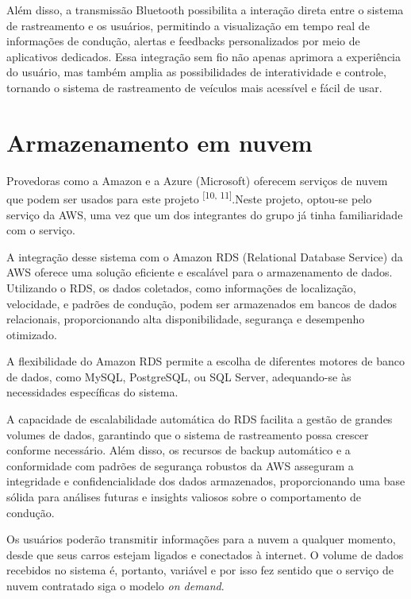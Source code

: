 Além disso, a transmissão Bluetooth possibilita a interação direta entre o sistema de rastreamento e os usuários, permitindo a visualização em tempo real de informações de condução, alertas e feedbacks personalizados por meio de aplicativos dedicados. Essa integração sem fio não apenas aprimora a experiência do usuário, mas também amplia as possibilidades de interatividade e controle, tornando o sistema de rastreamento de veículos mais acessível e fácil de usar.

\section{Armazenamento em nuvem}
Provedoras como a Amazon e a Azure (Microsoft) oferecem serviços de nuvem que podem ser usados para este projeto \textsuperscript{[10, 11]}.Neste projeto, optou-se pelo serviço da AWS, uma vez que um dos integrantes do grupo já tinha familiaridade com o serviço.

A integração desse sistema com o Amazon RDS (Relational Database Service) da AWS oferece uma solução eficiente e escalável para o armazenamento de dados. Utilizando o RDS, os dados coletados, como informações de localização, velocidade, e padrões de condução, podem ser armazenados em bancos de dados relacionais, proporcionando alta disponibilidade, segurança e desempenho otimizado. 

A flexibilidade do Amazon RDS permite a escolha de diferentes motores de banco de dados, como MySQL, PostgreSQL, ou SQL Server, adequando-se às necessidades específicas do sistema.

A capacidade de escalabilidade automática do RDS facilita a gestão de grandes volumes de dados, garantindo que o sistema de rastreamento possa crescer conforme necessário. Além disso, os recursos de backup automático e a conformidade com padrões de segurança robustos da AWS asseguram a integridade e confidencialidade dos dados armazenados, proporcionando uma base sólida para análises futuras e insights valiosos sobre o comportamento de condução.

Os usuários poderão transmitir informações para a nuvem a qualquer momento, desde que seus carros estejam ligados e conectados à internet. O volume de dados recebidos no sistema é, portanto, variável e por isso fez sentido que o serviço de nuvem contratado siga o modelo \textit{on demand}.
